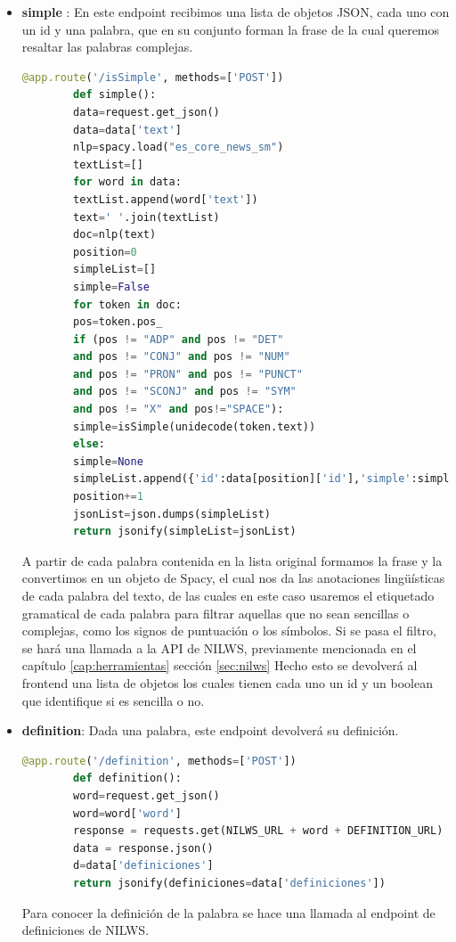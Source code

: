 \begin{itemize}
	\item \textbf{simple} \label{isSimple}: En este endpoint recibimos una lista de objetos JSON, cada uno con un id y una palabra, que en su conjunto forman la frase de la cual queremos resaltar las palabras complejas.
	\begin{lstlisting}[language=Python]
		@app.route('/isSimple', methods=['POST'])
		def simple():
		data=request.get_json()
		data=data['text']
		nlp=spacy.load("es_core_news_sm")
		textList=[]
		for word in data:
		textList.append(word['text'])
		text=' '.join(textList)
		doc=nlp(text)
		position=0
		simpleList=[]
		simple=False
		for token in doc:
		pos=token.pos_
		if (pos != "ADP" and pos != "DET"
		and pos != "CONJ" and pos != "NUM"
		and pos != "PRON" and pos != "PUNCT"
		and pos != "SCONJ" and pos != "SYM"
		and pos != "X" and pos!="SPACE"):
		simple=isSimple(unidecode(token.text))
		else:
		simple=None
		simpleList.append({'id':data[position]['id'],'simple':simple})
		position+=1
		jsonList=json.dumps(simpleList)
		return jsonify(simpleList=jsonList)
	\end{lstlisting}
	A partir de cada palabra contenida en la lista original formamos la frase y la convertimos en un objeto de Spacy, el cual nos da las anotaciones lingüísticas de cada palabra del texto, de las cuales en este caso usaremos el etiquetado gramatical de cada palabra para filtrar aquellas que no sean sencillas o complejas, como los signos de puntuación o los símbolos.
	Si se pasa el filtro, se hará una llamada a la API de NILWS, previamente mencionada en el capítulo \ref{cap:herramientas} sección \ref{sec:nilws}
	Hecho esto se devolverá al frontend una lista de objetos los cuales tienen cada uno un id y un boolean que identifique si es sencilla o no.
	
	\item \textbf{definition}\label{definition}: Dada una palabra, este endpoint devolverá su definición.
	\begin{lstlisting}[language=Python]
		@app.route('/definition', methods=['POST'])
		def definition():
		word=request.get_json()
		word=word['word']
		response = requests.get(NILWS_URL + word + DEFINITION_URL)
		data = response.json()
		d=data['definiciones']
		return jsonify(definiciones=data['definiciones'])
	\end{lstlisting}
	Para conocer la definición de la palabra se hace una llamada al endpoint de definiciones de NILWS.
	

\end{itemize}
